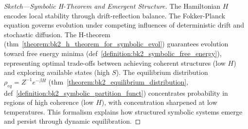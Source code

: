 \begin{proof}[Sketch—Symbolic H-Theorem and Emergent Structure]
\label{proof:bk2_symbolic_h_theorem}
The Hamiltonian $H$ encodes local stability through drift-reflection balance. The Fokker-Planck equation governs evolution under competing influences of deterministic drift and stochastic diffusion. The H-theorem (thm~\ref{theorem:bk2_h_theorem_for_symbolic_evol}) guarantees evolution toward free energy minima (def~\ref{definition:bk2_symbolic_free_energy}), representing optimal trade-offs between achieving coherent structures (low $H$) and exploring available states (high $S$). The equilibrium distribution $\rho_{eq} = Z^{-1}e^{-\beta H}$ (thm~\ref{theorem:bk2_equilibrium_distribution}, def~\ref{definition:bk2_symbolic_partition_funct}) concentrates probability in regions of high coherence (low $H$), with concentration sharpened at low temperatures. This formalism explains how structured symbolic systems emerge and persist through dynamic equilibration.
\end{proof}